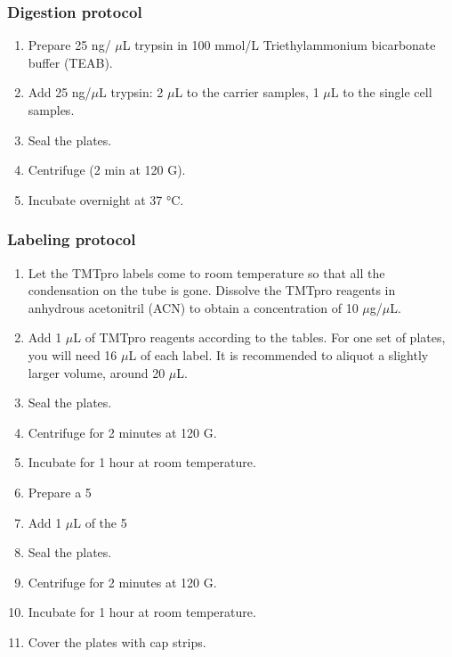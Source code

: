 \documentclass[
  11pt,
]{article}
\begin{document}
\hypertarget{digestion-protocol}{%
\subsubsection{Digestion protocol}\label{digestion-protocol}}

\begin{enumerate}
\item Prepare 25 ng/ $\mu$L trypsin in 100 mmol/L Triethylammonium bicarbonate buffer (TEAB).
\item Add 25 ng/$\mu$L trypsin: 2 $\mu$L to the carrier samples, 1 $\mu$L to the single cell samples.
\item Seal the plates.
\item Centrifuge (2 min at 120 G).
\item Incubate overnight at 37 °C.
\end{enumerate}

\hypertarget{labeling-protocol}{%
\subsubsection{Labeling protocol}\label{labeling-protocol}}

\begin{enumerate}
\item Let the TMTpro labels come to room temperature so that all the condensation on the tube is gone. Dissolve the TMTpro reagents in anhydrous acetonitril (ACN) to obtain a concentration of 10 $\mu$g/$\mu$L.
\item Add 1 $\mu$L of TMTpro reagents according to the tables. For one set of plates, you will need 16 $\mu$L of each label. It is recommended to aliquot a slightly larger volume, around 20 $\mu$L.
\item Seal the plates.
\item Centrifuge for 2 minutes at 120 G.
\item Incubate for 1 hour at room temperature.
\item Prepare a 5%
\item Add 1 $\mu$L of the 5%
\item Seal the plates.
\item Centrifuge for 2 minutes at 120 G.
\item Incubate for 1 hour at room temperature.
\item Cover the plates with cap strips.
\end{enumerate}
\end{document}
